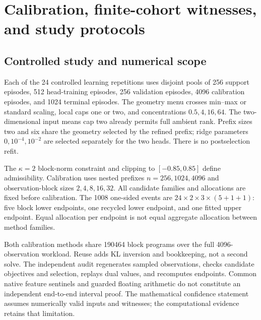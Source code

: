 \section{Calibration, finite-cohort witnesses, and study protocols}
\label{app:protocols}
\subsection{Controlled study and numerical scope}
Each of the 24 controlled learning repetitions uses disjoint pools of 256 support episodes, 512 head-training episodes, 256 validation episodes, 4096 calibration episodes, and 1024 terminal episodes. The geometry menu crosses min--max or standard scaling, local caps one or two, and concentrations $0.5,4,16,64$. The two-dimensional input means cap two already permits full ambient rank. Prefix sizes two and six share the geometry selected by the refined prefix; ridge parameters $0,10^{-4},10^{-2}$ are selected separately for the two heads. There is no postselection refit.

The $\kappa=2$ block-norm constraint and clipping to $[-0.85,0.85]$ define admissibility. Calibration uses nested prefixes $n=256,1024,4096$ and observation-block sizes $2,4,8,16,32$. All candidate families and allocations are fixed before calibration. The 1008 one-sided events are
$24\times2\times3\times(5+1+1)$: five block lower endpoints, one recycled lower endpoint, and one fitted upper endpoint. Equal allocation per endpoint is not equal aggregate allocation between method families.

Both calibration methods share 190464 block programs over the full 4096-observation workload. Reuse adds KL inversion and bookkeeping, not a second solve. The independent audit regenerates sampled observations, checks candidate objectives and selection, replays dual values, and recomputes endpoints. Common native feature sentinels and guarded floating arithmetic do not constitute an independent end-to-end interval proof. The mathematical confidence statement assumes numerically valid inputs and witnesses; the computational evidence retains that limitation.


